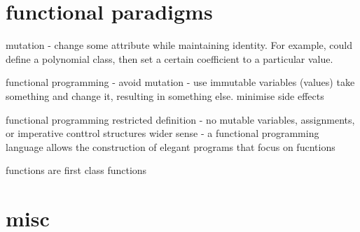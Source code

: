 \documentclass{article}
\begin{document}
\section{functional paradigms}


mutation - change some attribute while maintaining identity. For example, could define a polynomial class, then set a certain coefficient to a particular value.

functional programming - avoid mutation - use immutable variables (values)
take something and change it, resulting in something else.
minimise side effects

functional programming
restricted definition - no mutable variables, assignments, or imperative conttrol structures
wider sense - a functional programming language allows the construction of elegant programs that focus on fucntions

functions are first class functions

\section{misc}
\end{document}
